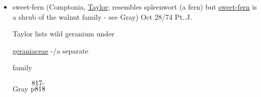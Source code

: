 \documentclass[a4paper,10pt]{article}
\begin{document}
\begin{flushleft}
\begin{itemize}
26/74
\par 
Chrysanthemum Balsomita Garden Ency Taylor)
\begin{adjustwidth}{-0.5in}{-0.5in}
    \rule{4.5in}{0.005in}  
\end{adjustwidth}
\begin{textblock*}{3.22in}(1.5cm,17.1cm)%
    \begin{minipage}{3.22in} 
        \large
        \color{red}
        ?
        \color{blue}
        ??
    \end{minipage}%
\end{textblock*}%
\begin{flushright}
$\downarrow$(identified as follow at {$\stackrel{\hbox{Suffolk}}{\hbox{Rose Soc.}}$})
\end{flushright}
\item sweet-fern (Comptonia, \ul{Taylor}; resembles spleenwort (a fern) but \ul{sweet-fern} is a shrub of the walnut family - see Gray)
Oct 28/74 Pt..J.\par
\color{red}
\footnotesize
\begin{minipage}{2in} 
    Taylor lists wild geranium under\par
    \ul{geraniaceae} -/a separate\par
    family
\end{minipage}%
\hfill
\begin{minipage}{0.6in}
    Gray $\stackrel{\hbox{817-}}{\hbox{p818}}$ 
\end{minipage}%

\end{itemize}
\end{flushleft}
\end{document}
